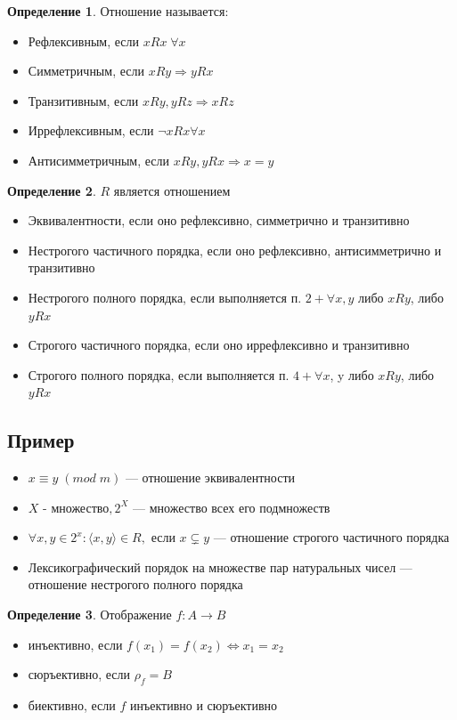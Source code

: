 \documentclass[12pt,letterpaper]{report}
\theoremstyle{definition}
\newtheorem*{conj}{Определение}
\begin{document}
\begin{conj}
    Отношение называется:
\end{conj}
\begin{itemize}
    \item Рефлексивным, если $xRx \; \forall x$
    \item Симметричным, если $xRy \Longrightarrow yRx$
    \item Транзитивным, если $xRy, yRz \Longrightarrow xRz$
    \item Иррефлексивным, если $\neg xRx \forall x$
    \item Антисимметричным, если $xRy, yRx \Longrightarrow x = y$
\end{itemize}

\begin{conj}
    $R$ является отношением
\end{conj}
\begin{itemize}
    \item[1.] Эквивалентности, если оно рефлексивно, симметрично и транзитивно
    \item[2.] Нестрогого частичного порядка, если оно рефлексивно, антисимметрично и транзитивно
    \item[3.] Нестрогого полного порядка, если выполняется п. $2 + \forall x, y$ либо $xRy$, либо $yRx$
    \item[4.] Строгого частичного порядка, если оно иррефлексивно и транзитивно
    \item[5.] Строгого полного порядка, если выполняется п. $4 + \forall x$, y либо $xRy$, либо $yRx$
\end{itemize}

\subsection*{Пример}
\begin{itemize}
    \item $x \equiv y \; (mod \; m)$ — отношение эквивалентности
    \item $X$ - множество$, 2^X$ — множество всех его подмножеств
    \item $\forall x, y \in 2^x : \langle x, y \rangle \in R, $ если $ x \subsetneq y$ — отношение строгого частичного порядка
    \item Лексикографический порядок на множестве пар натуральных чисел — отношение нестрогого полного порядка
\end{itemize}

\begin{conj}
    Отображение $f: A  \longrightarrow B$ 
\end{conj}
\begin{itemize}
    \item инъективно, если $f(x_1) = f(x_2) \Longleftrightarrow x_1 = x_2$
    \item сюръективно, если $\rho_f = B$
    \item биективно, если $f$ инъективно и сюръективно
\end{itemize}
\end{document}

